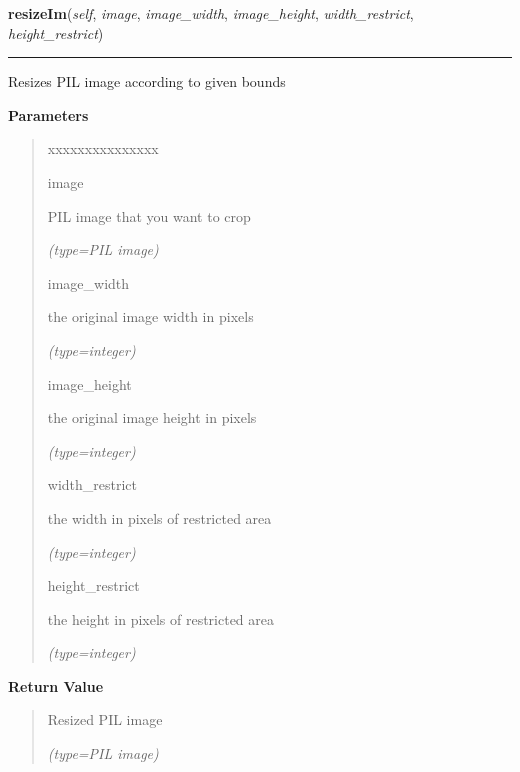 \hspace{.8\funcindent}\begin{boxedminipage}{\funcwidth}

    \raggedright \textbf{resizeIm}(\textit{self}, \textit{image}, \textit{image\_width}, \textit{image\_height}, \textit{width\_restrict}, \textit{height\_restrict})

    \vspace{-1.5ex}

    \rule{\textwidth}{0.5\fboxrule}
\setlength{\parskip}{2ex}
    Resizes PIL image according to given bounds

\setlength{\parskip}{1ex}
      \textbf{Parameters}
      \vspace{-1ex}

      \begin{quote}
        \begin{Ventry}{xxxxxxxxxxxxxxx}

          \item[image]

          PIL image that you want to crop

            {\it (type=PIL image)}

          \item[image\_width]

          the original image width in pixels

            {\it (type=integer)}

          \item[image\_height]

          the original image height in pixels

            {\it (type=integer)}

          \item[width\_restrict]

          the width in pixels of restricted area

            {\it (type=integer)}

          \item[height\_restrict]

          the height in pixels of restricted area

            {\it (type=integer)}

        \end{Ventry}

      \end{quote}

      \textbf{Return Value}
    \vspace{-1ex}

      \begin{quote}
      Resized PIL image

      {\it (type=PIL image)}

      \end{quote}

    \end{boxedminipage}

